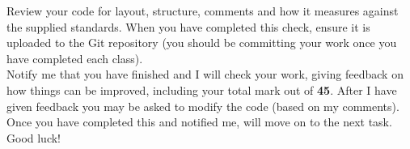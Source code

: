 \documentclass[a4paper,12pt]{article}
\begin{document}
Review your code for layout, structure, comments and how it measures against the supplied standards. When you have completed this check, ensure it is uploaded to the Git repository (you should be committing your work once you have completed each class).\\

Notify me that you have finished and I will check your work, giving feedback on how things can be improved, including your total mark out of {\bf 45}. After I have given feedback you may be asked to modify the code (based on my comments). Once you have completed this and notified me, will move on to the next task. Good luck!
\end{document}
